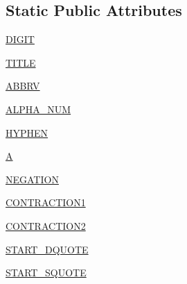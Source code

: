 \subsection*{Static Public Attributes}
\begin{DoxyCompactItemize}
\item 
\hyperlink{classparlai_1_1agents_1_1tfidf__retriever_1_1tokenizers_1_1regexp__tokenizer_1_1RegexpTokenizer_a5cb6a9c3fa5ff33288aaf8658e5e5e91}{D\+I\+G\+IT}
\item 
\hyperlink{classparlai_1_1agents_1_1tfidf__retriever_1_1tokenizers_1_1regexp__tokenizer_1_1RegexpTokenizer_a1621d467b4fe6c0b847670cc08f0acfe}{T\+I\+T\+LE}
\item 
\hyperlink{classparlai_1_1agents_1_1tfidf__retriever_1_1tokenizers_1_1regexp__tokenizer_1_1RegexpTokenizer_a7cf87d81bf1f59361512fc325ea65d31}{A\+B\+B\+RV}
\item 
\hyperlink{classparlai_1_1agents_1_1tfidf__retriever_1_1tokenizers_1_1regexp__tokenizer_1_1RegexpTokenizer_adf4adba98ab5f5af003f31e6890b5410}{A\+L\+P\+H\+A\+\_\+\+N\+UM}
\item 
\hyperlink{classparlai_1_1agents_1_1tfidf__retriever_1_1tokenizers_1_1regexp__tokenizer_1_1RegexpTokenizer_a46dd6a31eba1ff5d9711ae03a894197b}{H\+Y\+P\+H\+EN}
\item 
\hyperlink{classparlai_1_1agents_1_1tfidf__retriever_1_1tokenizers_1_1regexp__tokenizer_1_1RegexpTokenizer_a7571f6fa8c50eb037d740ec38ea59099}{A}
\item 
\hyperlink{classparlai_1_1agents_1_1tfidf__retriever_1_1tokenizers_1_1regexp__tokenizer_1_1RegexpTokenizer_a15bdf16c131d601bdb5cd909d260d0ca}{N\+E\+G\+A\+T\+I\+ON}
\item 
\hyperlink{classparlai_1_1agents_1_1tfidf__retriever_1_1tokenizers_1_1regexp__tokenizer_1_1RegexpTokenizer_aee01ee2ff50a6c1808f6c3d67758e73b}{C\+O\+N\+T\+R\+A\+C\+T\+I\+O\+N1}
\item 
\hyperlink{classparlai_1_1agents_1_1tfidf__retriever_1_1tokenizers_1_1regexp__tokenizer_1_1RegexpTokenizer_a74e344bdcfbbc9f17554b192c6c9d496}{C\+O\+N\+T\+R\+A\+C\+T\+I\+O\+N2}
\item 
\hyperlink{classparlai_1_1agents_1_1tfidf__retriever_1_1tokenizers_1_1regexp__tokenizer_1_1RegexpTokenizer_aa3493dad5853507b77683a4b3ec3fa45}{S\+T\+A\+R\+T\+\_\+\+D\+Q\+U\+O\+TE}
\item 
\hyperlink{classparlai_1_1agents_1_1tfidf__retriever_1_1tokenizers_1_1regexp__tokenizer_1_1RegexpTokenizer_aae1e4583880d8dba0bd41c8cdfa54ce3}{S\+T\+A\+R\+T\+\_\+\+S\+Q\+U\+O\+TE}
\item 

\end{DoxyCompactItemize}
